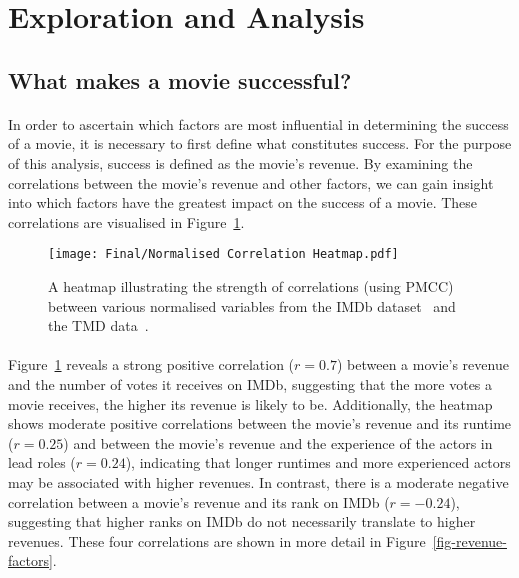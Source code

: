 \newpage
\section{Exploration and Analysis}
    \subsection{What makes a movie successful?}
        \begin{multicols}{2}
            \paragraph{}
                In order to ascertain which factors are most influential in determining the
                    success of a movie, it is necessary to first define what constitutes success.
                For the purpose of this analysis, success is defined as the movie's revenue.
                By examining the correlations between the movie's revenue and other factors, we
                    can gain insight into which factors have the greatest impact on the success of
                    a movie.
                These correlations are visualised in Figure~\ref{fig-heatmap}.

                \begin{figure}[H]
                    \centering
                    \texttt{[image: Final/Normalised Correlation Heatmap.pdf]}
                    \caption{
                        A heatmap illustrating the strength of correlations (using PMCC) between various normalised
                        variables from the IMDb dataset~\cite{data:IMDb} and the TMD
                        data~\cite{data:TMD}.
                    }\label{fig-heatmap}
                \end{figure}

            \paragraph{}
                Figure~\ref{fig-heatmap} reveals a strong positive correlation ($r=0.7$)
                    between a movie's revenue and the number of votes it receives on IMDb,
                    suggesting that the more votes a movie receives, the higher its revenue is
                    likely to be.
                Additionally, the heatmap shows moderate positive correlations between the
                    movie's revenue and its runtime ($r=0.25$) and between the movie's revenue and
                    the experience of the actors in lead roles ($r=0.24$), indicating that longer
                    runtimes and more experienced actors may be associated with higher revenues.
                In contrast, there is a moderate negative correlation between a movie's revenue
                    and its rank on IMDb ($r=-0.24$), suggesting that higher ranks on IMDb do not
                    necessarily translate to higher revenues.
                These four correlations are shown in more detail in
                    Figure~\ref{fig-revenue-factors}.


\end{multicols}
